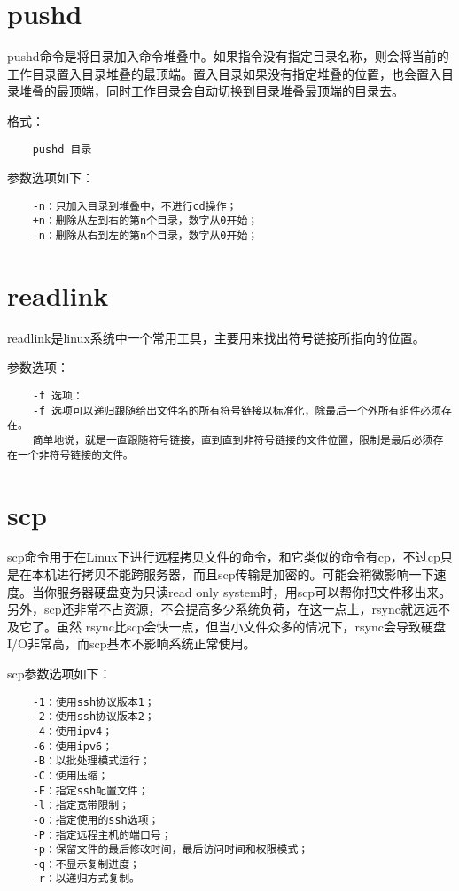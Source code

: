 \documentclass[a4paper,left=2.5cm,right=2.5cm,11pt]{article}
\begin{document}
\section{pushd}
	pushd命令是将目录加入命令堆叠中。如果指令没有指定目录名称，则会将当前的工作目录置入目录堆叠的最顶端。置入目录如果没有指定堆叠的位置，也会置入目录堆叠的最顶端，同时工作目录会自动切换到目录堆叠最顶端的目录去。\par

	格式：
	\begin{lstlisting}
	pushd 目录
	\end{lstlisting}

	参数选项如下：
	\begin{lstlisting}
	-n：只加入目录到堆叠中，不进行cd操作； 
	+n：删除从左到右的第n个目录，数字从0开始； 
	-n：删除从右到左的第n个目录，数字从0开始；
	\end{lstlisting}

\section{readlink}
	readlink是linux系统中一个常用工具，主要用来找出符号链接所指向的位置。\par

	参数选项：
	\begin{lstlisting}
	-f 选项：
	-f 选项可以递归跟随给出文件名的所有符号链接以标准化，除最后一个外所有组件必须存在。
	简单地说，就是一直跟随符号链接，直到直到非符号链接的文件位置，限制是最后必须存在一个非符号链接的文件。
	\end{lstlisting}

\section{scp}
	scp命令用于在Linux下进行远程拷贝文件的命令，和它类似的命令有cp，不过cp只是在本机进行拷贝不能跨服务器，而且scp传输是加密的。可能会稍微影响一下速度。当你服务器硬盘变为只读read only system时，用scp可以帮你把文件移出来。另外，scp还非常不占资源，不会提高多少系统负荷，在这一点上，rsync就远远不及它了。虽然 rsync比scp会快一点，但当小文件众多的情况下，rsync会导致硬盘I/O非常高，而scp基本不影响系统正常使用。\par

	scp参数选项如下：
	\begin{lstlisting}
	-1：使用ssh协议版本1； 
	-2：使用ssh协议版本2； 
	-4：使用ipv4； 
	-6：使用ipv6； 
	-B：以批处理模式运行； 
	-C：使用压缩； 
	-F：指定ssh配置文件； 
	-l：指定宽带限制； 
	-o：指定使用的ssh选项； 
	-P：指定远程主机的端口号； 
	-p：保留文件的最后修改时间，最后访问时间和权限模式； 
	-q：不显示复制进度； 
	-r：以递归方式复制。
	\end{lstlisting}
\end{document}
